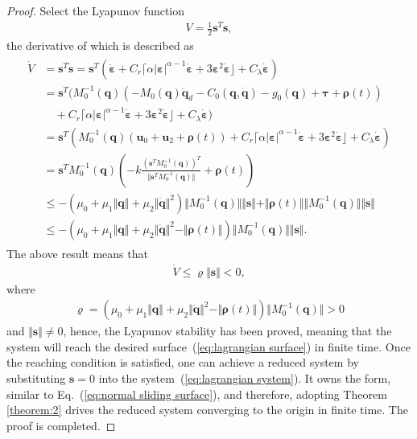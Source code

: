 \documentclass[3p]{elsarticle}
\theoremstyle{plain}
\theoremstyle{remark}
\begin{document}
\begin{proof}
Select the Lyapunov function
\begin{align}
V=\frac{1}{2}\bm s^T\bm s,
\end{align}
the derivative of which is described as
\begin{align}
\begin{split}
\dot V &= \bm s^T\dot{\bm s}=\bm s^T(\ddot{\bm \varepsilon}+C_r\lceil\alpha\vert\bm\varepsilon\vert^{\alpha-1}\dot{\bm \varepsilon}+3\bm \varepsilon^2\dot{\bm \varepsilon}\rfloor+C_\lambda\dot{\bm \varepsilon})\\
&=\bm s^T(M_0^{-1}(\bm q)(-M_0(\bm q)\ddot {\bm q}_d-C_0(\bm q,\dot {\bm q})-g_0(\bm q)+\bm\tau+\bm\rho(t))\\
&\quad+C_r\lceil\alpha\vert\bm\varepsilon\vert^{\alpha-1}\dot{\bm \varepsilon}+3\bm \varepsilon^2\dot{\bm \varepsilon}\rfloor+C_\lambda\dot{\bm \varepsilon})\\
&=\bm s^T(M_0^{-1}(\bm q)(\bm u_0+\bm u_2+\bm\rho(t))+C_r\lceil\alpha\vert\bm\varepsilon\vert^{\alpha-1}\dot{\bm \varepsilon}+3\bm \varepsilon^2\dot{\bm \varepsilon}\rfloor+C_\lambda\dot{\bm \varepsilon})\\
&=\bm s^TM_0^{-1}(\bm q)(-k\frac{(\bm s^TM_0^{-1}(\bm q))^T}{\Vert\bm s^TM_0^{-1}(\bm q)\Vert}+\bm\rho(t))\\
&\le -(\mu_0+\mu_1\Vert\bm q\Vert+\mu_2\Vert\dot{\bm q}\Vert^2)\Vert M_0^{-1}(\bm q)\Vert\Vert \bm s\Vert+\Vert\bm\rho(t)\Vert\Vert M_0^{-1}(\bm q)\Vert\Vert \bm s\Vert\\
&\le -(\mu_0+\mu_1\Vert\bm q\Vert+\mu_2\Vert\dot{\bm q}\Vert^2-\Vert\bm\rho(t)\Vert)\Vert M_0^{-1}(\bm q)\Vert\Vert \bm s\Vert.
\end{split}
\end{align}
The above result means that
\begin{align}
\dot V \le \varrho\Vert\bm s\Vert<0,
\end{align}
where
\begin{align}
\varrho=(\mu_0+\mu_1\Vert\bm q\Vert+\mu_2\Vert\dot{\bm q}\Vert^2-\Vert\bm\rho(t)\Vert)\Vert M_0^{-1}(\bm q)\Vert>0
\end{align}
and $\Vert\bm s\Vert\neq 0$, hence, the Lyapunov stability has been proved, meaning that the system will reach the desired surface~(\ref{eq:lagrangian surface}) in finite time. Once the reaching condition is satisfied, one can achieve a reduced system by substituting $\bm s = 0$ into the system~(\ref{eq:lagrangian system}). It owns the form, similar to Eq.~(\ref{eq:normal sliding surface}), and therefore, adopting Theorem \ref{theorem:2} drives the reduced system converging to the origin in finite time. The proof is completed.
\end{proof}
\end{document}
